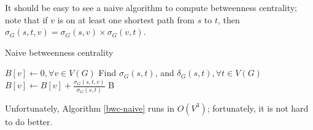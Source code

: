 It should be easy to see a naive algorithm to compute betweenness centrality;
note that if $v$ is on at least one shortest path from $s$ to $t$,
then $\sigma_G(s, t, v) = \sigma_G(s, v) \times \sigma_G(v, t)$.
\begin{algorithm}
\caption{Naive betweenness centrality}
\label{bwc-naive}
\begin{algorithmic}
	\State $B[v] \gets 0, \forall v \in V(G)$
		\State Find $\sigma_G(s, t)$, and $\delta_G(s, t), \forall t \in V(G)$
					\State 
					$B[v] \gets B[v] + \frac{\sigma_G(s, t, v)}{\sigma_G(s, t)}$
				\EndIf
			\EndFor
		\EndFor
	\EndFor
	\State \Return B
\EndFunction
\end{algorithmic}
\end{algorithm}
Unfortunately, Algorithm \ref{bwc-naive} runs in $O(V^3)$; fortunately, it is
not hard to do better.
